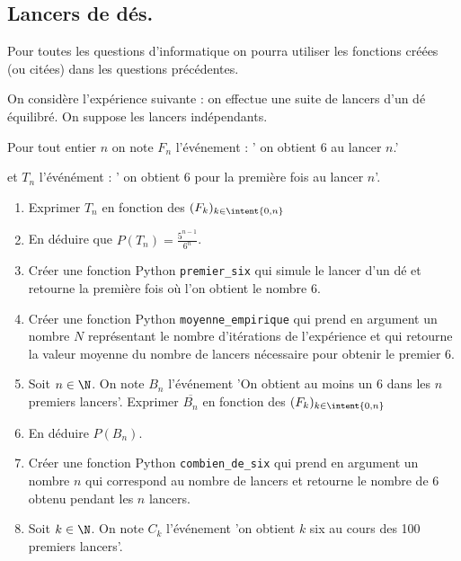 \subsection{Lancers de dés. }



\begin{exercice}
Pour toutes les questions d'informatique on pourra utiliser les fonctions créées (ou citées) dans les questions précédentes. 

On considère l'expérience suivante : on effectue une suite de lancers d'un dé  équilibré. On suppose les lancers indépendants. 

Pour tout entier $n$ on note $F_n $ l'événement 
: ' on obtient 6 au  lancer $n$.' 

et $T_n$ l'événément : ' on obtient 6 pour la première fois au lancer $n$'.

\begin{enumerate}
\item Exprimer $T_n$ en fonction des $(F_k)_{k\in \intent{0,n}}$
\item En déduire que $P(T_n) = \frac{5^{n-1} }{6^n}$. 
\item Créer une fonction Python \texttt{premier\_six} qui simule le lancer d'un dé et retourne la première fois où l'on obtient le nombre 6. 
\item Créer une fonction Python \texttt{moyenne\_empirique} qui prend en argument un nombre $N$ représentant le nombre d'itérations de l'expérience et qui retourne la valeur moyenne du nombre de lancers nécessaire pour obtenir le premier 6. 
\item Soit $n\in \N$. On note $B_n$ l'événement 'On obtient  au moins un 6 dans les $n$ premiers lancers'. Exprimer $\overline{B_n}$  en fonction des $(F_k)_{k\in \intent{0,n}}$
\item En déduire $P(B_n)$. 
\item Créer une fonction  Python \texttt{combien\_de\_six} qui prend en argument un nombre $n$ qui correspond au nombre de lancers et retourne le nombre de $6$ obtenu pendant les $n$ lancers. 

\item Soit $k\in \N$. On note $C_k$ l'événement 'on obtient $k$ six au cours des 100 premiers lancers'.


\end{enumerate}
\end{exercice}
